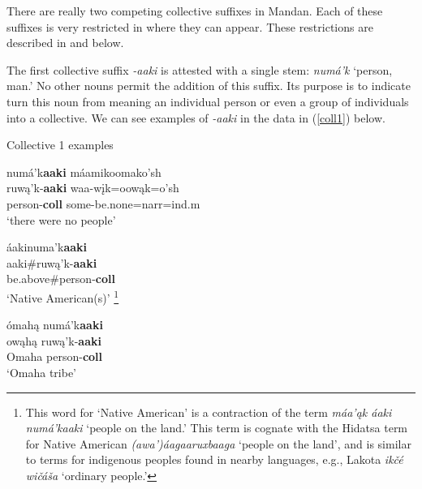 \label{suffixcollective}

There are really two competing collective suffixes in Mandan. Each of these suffixes is very restricted in where they can appear. These restrictions are described in  and  below.

\label{suffixcollective1}

The first collective suffix \textit{-aaki} is attested with a single stem: \textit{numá'k} `person, man.' No other nouns permit the addition of this suffix. Its purpose is to indicate turn this noun from meaning an individual person or even a group of individuals into a collective. We can see examples of \textit{-aaki} in the data in (\ref{coll1}) below.

\begin{exe}

\item\label{coll1} Collective 1 examples

	\begin{xlist}
	
	\item \glll numá'k\textbf{aaki} máamikoomako'sh\\
	ruwą'k-\textbf{aaki} waa-wįk=oowąk=o'sh\\
	\textnormal{person}-\textbf{coll} \textnormal{some}-\textnormal{be.none}=narr=ind.m\\
	\glt `there were no people' \citep[178]{hollow1973a}
	
	\item \glll áakinuma'k\textbf{aaki}\\
	aaki\#ruwą'k-\textbf{aaki}\\
	\textnormal{be.above}\#\textnormal{person}-\textbf{coll}\\
	\glt `Native American(s)' \citep[220]{trechter2012b}\footnote{This word for `Native American' is a contraction of the term \textit{máa'ąk áaki numá'kaaki} `people on the land.' This term is cognate with the Hidatsa term for Native American \textit{(awa')áagaaruxbaaga} `people on the land', and is similar to terms for indigenous peoples found in nearby languages, e.g., Lakota \textit{ikčé wičáša} `ordinary people.'}
	
	\item \glll ómahą numá'k\textbf{aaki}\\
	owąhą ruwą'k-\textbf{aaki}\\
	\textnormal{Omaha} \textnormal{person}-\textbf{coll}\\
	\glt `Omaha tribe' \citep[431]{hollow1970}
		
	\end{xlist}

\end{exe}

